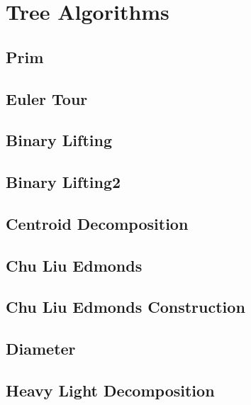 \documentclass[10pt]{article}
\begin{document}
\section{Tree Algorithms}
\subsection{\texorpdfstring{{Prim}}{{Prim}}}

\subsection{\texorpdfstring{{Euler Tour}}{{Euler Tour}}}

\subsection{\texorpdfstring{{Binary Lifting}}{{Binary Lifting}}}

\subsection{\texorpdfstring{{Binary Lifting2}}{{Binary Lifting2}}}

\subsection{\texorpdfstring{{Centroid Decomposition}}{{Centroid Decomposition}}}

\subsection{\texorpdfstring{{Chu Liu Edmonds}}{{Chu Liu Edmonds}}}

\subsection{\texorpdfstring{{Chu Liu Edmonds Construction}}{{Chu Liu Edmonds Construction}}}

\subsection{\texorpdfstring{{Diameter}}{{Diameter}}}

\subsection{\texorpdfstring{{Heavy Light Decomposition}}{{Heavy Light Decomposition}}}

\end{document}
